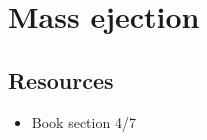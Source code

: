 %
%
%




%
%
%




\newpage
\section{Mass ejection}

\subsection*{Resources}
\begin{itemize}
    \item Book section 4/7
\end{itemize}

